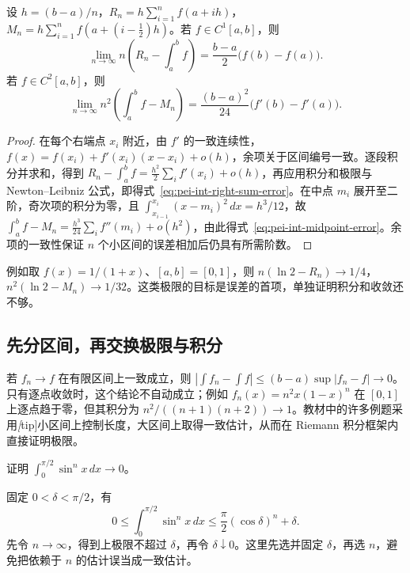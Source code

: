 \begin{proposition}
\label{prop:pei-int-quadrature-asymptotic}
设 $h=(b-a)/n$，$R_n=h\sum_{i=1}^n f(a+ih)$，$M_n=h\sum_{i=1}^n f(a+(i-\tfrac12)h)$。若 $f\in C^1[a,b]$，则
\begin{equation}
 \lim_{n\to\infty}n\left(R_n-\int_a^b f\right)=\frac{b-a}{2}\bigl(f(b)-f(a)\bigr).
 \label{eq:pei-int-right-sum-error}
\end{equation}
若 $f\in C^2[a,b]$，则
\begin{equation}
 \lim_{n\to\infty}n^2\left(\int_a^b f-M_n\right)=\frac{(b-a)^2}{24}\bigl(f'(b)-f'(a)\bigr).
 \label{eq:pei-int-midpoint-error}
\end{equation}
\end{proposition}
\begin{proof}
在每个右端点 $x_i$ 附近，由 $f'$ 的一致连续性，$f(x)=f(x_i)+f'(x_i)(x-x_i)+o(h)$，余项关于区间编号一致。逐段积分并求和，得到 $R_n-\int_a^b f=\tfrac{h^2}{2}\sum_i f'(x_i)+o(h)$，再应用积分和极限与 Newton--Leibniz 公式，即得式~\eqref{eq:pei-int-right-sum-error}。在中点 $m_i$ 展开至二阶，奇次项的积分为零，且 $\int_{x_{i-1}}^{x_i}(x-m_i)^2\,dx=h^3/12$，故 $\int_a^b f-M_n=\tfrac{h^3}{24}\sum_i f''(m_i)+o(h^2)$，由此得式~\eqref{eq:pei-int-midpoint-error}。余项的一致性保证 $n$ 个小区间的误差相加后仍具有所需阶数。
\end{proof}
例如取 $f(x)=1/(1+x)$、$[a,b]=[0,1]$，则 $n(\ln2-R_n)\to1/4$，$n^2(\ln2-M_n)\to1/32$。这类极限的目标是误差的首项，单独证明积分和收敛还不够。

\subsection{先分区间，再交换极限与积分}
若 $f_n\to f$ 在有限区间上一致成立，则 $|\int f_n-\int f|\le(b-a)\sup|f_n-f|\to0$。只有逐点收敛时，这个结论不自动成立；例如 $f_n(x)=n^2x(1-x)^n$ 在 $[0,1]$ 上逐点趋于零，但其积分为 $n^2/((n+1)(n+2))\to1$。教材中的许多例题采用\emph[tip]{小区间上控制长度，大区间上取得一致估计}，从而在 Riemann 积分框架内直接证明极限。

\begin{example}
证明 $\displaystyle\int_0^{\pi/2}\sin^n x\,dx\to0$。
\end{example}
\begin{solve}
固定 $0<\delta<\pi/2$，有
\[
 0\le\int_0^{\pi/2}\sin^n x\,dx
 \le\frac\pi2(\cos\delta)^n+\delta.
\]
先令 $n\to\infty$，得到上极限不超过 $\delta$，再令 $\delta\downarrow0$。这里先选并固定 $\delta$，再选 $n$，避免把依赖于 $n$ 的估计误当成一致估计。
\end{solve}

